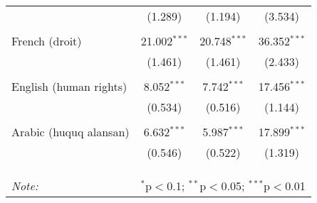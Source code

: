 \begin{table}[!htbp]
\begin{tabular}{@{\extracolsep{5pt}}lccc}
  & (1.289) & (1.194) & (3.534) \\ 
  & & & \\ 
 French (droit) & 21.002$^{***}$ & 20.748$^{***}$ & 36.352$^{***}$ \\ 
  & (1.461) & (1.461) & (2.433) \\ 
  & & & \\ 
 English (human rights) & 8.052$^{***}$ & 7.742$^{***}$ & 17.456$^{***}$ \\ 
  & (0.534) & (0.516) & (1.144) \\ 
  & & & \\ 
 Arabic (huquq alansan) & 6.632$^{***}$ & 5.987$^{***}$ & 17.899$^{***}$ \\ 
  & (0.546) & (0.522) & (1.319) \\ 
  & & & \\ 
\hline \\[-1.8ex] 
\hline 
\hline \\[-1.8ex] 
\textit{Note:}  & \multicolumn{3}{r}{$^{*}$p$<$0.1; $^{**}$p$<$0.05; $^{***}$p$<$0.01} \\ 
\end{tabular} 
\end{table} 
